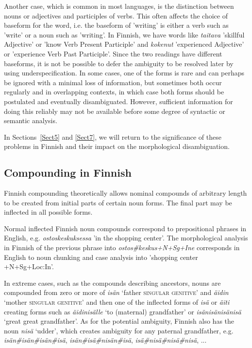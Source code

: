 \documentclass[postprint]{flammie}
\begin{document}
Another case, which is common in most languages, is the distinction
between nouns or adjectives and participles of verbs. This often
affects the choice of baseform for the word, i.e. the baseform of
'writing' is either a verb such as 'write' or a noun such as
'writing'. In Finnish, we have words like {\em taitava} 'skillful
Adjective' or 'know Verb Present Participle' and {\em kokenut}
'experienced Adjective' or 'experience Verb Past Participle'. Since
the two readings have different baseforms, it is not be possible to
defer the ambiguity to be resolved later by using underspecification.
In some cases, one of the forms is rare and can perhaps be ignored
with a minimal loss of information, but sometimes both occur regularly
and in overlapping contexts, in which case both forms should be
postulated and eventually disambiguated. However, sufficient
information for doing this reliably may not be available before some
degree of syntactic or semantic analysis.

In Sections~\ref{Sect5} and \ref{Sect7}, we will return to the
significance of these problems in Finnish and their impact on the
morphological disambiguation.

\subsection{Compounding in Finnish}
\label{Sect12}

Finnish compounding theoretically allows nominal compounds of
arbitrary length to be created from initial parts of certain noun
forms. The final part may be inflected in all possible forms.

Normal inflected Finnish noun compounds correspond to prepositional
phrases in English, e.g. {\em ostoskeskuksessa} 'in the shopping
center'. The morphological analysis in Finnish of the previous phrase
into {\em ostos\#keskus+N+Sg+Ine} corresponds in English to noun
chunking and case analysis into 'shopping center +N+Sg+Loc:In'.

In extreme cases, such as the compounds describing ancestors, nouns
are compounded from zero or more of \emph{isän} `father
\textsc{singular genitive}' and \emph{äidin} `mother \textsc{singular
  genitive}' and then one of the inflected forms of \emph{isä} or
\emph{äiti} creating forms such as \emph{äidinisälle} `to (maternal)
grandfather' or \emph{isänisänisänisä} `great great grandfather'.  As
for the potential ambiguity, Finnish also has the noun \emph{nisä}
`udder', which creates ambiguity for any paternal grandfather,
e.g. \emph{isän\#isän\#isän\#isä}, \emph{isän\#isä\#nisän\#isä},
\emph{isä\#nisä\#nisä\#\-nisä}, ...
\end{document}

